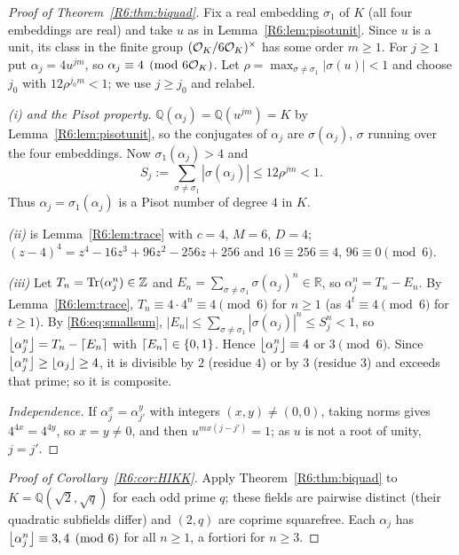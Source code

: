 \documentclass[11pt]{amsart}
\theoremstyle{definition}
\theoremstyle{remark}
\providecommand{\R}{\mathbb R}
\providecommand{\Q}{\mathbb Q}
\providecommand{\Z}{\mathbb Z}
\begin{document}
\begin{proof}[Proof of Theorem~\ref{R6:thm:biquad}]
Fix a real embedding $\sigma_1$ of $K$ (all four embeddings are real) and take $u$ as in
Lemma~\ref{R6:lem:pisotunit}. Since $u$ is a unit, its class in the finite group
$(\mathcal{O}_K/6\mathcal{O}_K)^\times$ has some order $m\ge1$. For $j\ge1$ put $\alpha_j=4u^{jm}$, so
$\alpha_j\equiv 4\pmod{6\mathcal{O}_K}$. Let $\rho=\max_{\sigma\neq\sigma_1}|\sigma(u)|<1$ and choose $j_0$ with
$12\rho^{j_0m}<1$; we use $j\ge j_0$ and relabel.

\emph{(i) and the Pisot property.} $\Q(\alpha_j)=\Q(u^{jm})=K$ by Lemma~\ref{R6:lem:pisotunit}, so the
conjugates of $\alpha_j$ are $\sigma(\alpha_j)$, $\sigma$ running over the four embeddings. Now
$\sigma_1(\alpha_j)>4$ and
\begin{equation}\label{R6:eq:smallsum}
S_j:=\sum_{\sigma\ne\sigma_1}|\sigma(\alpha_j)|\le 12\rho^{jm}<1 .
\end{equation}
Thus $\alpha_j=\sigma_1(\alpha_j)$ is a Pisot number of degree $4$ in $K$.

\emph{(ii)} is Lemma~\ref{R6:lem:trace} with $c=4$, $M=6$, $D=4$; $(z-4)^4=z^4-16z^3+96z^2-256z+256$
and $16\equiv 256\equiv 4$, $96\equiv0\pmod 6$.

\emph{(iii)} Let $T_n=\Tr(\alpha_j^n)\in\Z$ and $E_n=\sum_{\sigma\ne\sigma_1}\sigma(\alpha_j)^n\in\R$, so
$\alpha_j^n=T_n-E_n$. By Lemma~\ref{R6:lem:trace}, $T_n\equiv 4\cdot4^n\equiv 4\pmod 6$ for $n\ge1$
(as $4^t\equiv4\pmod 6$ for $t\ge1$). By \eqref{R6:eq:smallsum},
$|E_n|\le\sum_{\sigma\ne\sigma_1}|\sigma(\alpha_j)|^n\le S_j^n<1$, so
$\left\lfloor \alpha_j^n\right\rfloor=T_n-\left\lceil E_n\right\rceil$ with $\left\lceil E_n\right\rceil\in\{0,1\}$. Hence
$\left\lfloor \alpha_j^n\right\rfloor\equiv 4$ or $3\pmod 6$. Since $\left\lfloor \alpha_j^n\right\rfloor\ge\left\lfloor \alpha_j\right\rfloor\ge4$, it is divisible
by $2$ (residue $4$) or by $3$ (residue $3$) and exceeds that prime; so it is composite.

\emph{Independence.} If $\alpha_j^x=\alpha_{j'}^y$ with integers $(x,y)\ne(0,0)$, taking norms gives
$4^{4x}=4^{4y}$, so $x=y\neq0$, and then $u^{mx(j-j')}=1$; as $u$ is not a root of unity, $j=j'$.
\end{proof}

\begin{proof}[Proof of Corollary~\ref{R6:cor:HIKK}]
Apply Theorem~\ref{R6:thm:biquad} to $K=\Q(\sqrt2,\sqrt q)$ for each odd prime $q$; these fields are
pairwise distinct (their quadratic subfields differ) and $(2,q)$ are coprime squarefree. Each
$\alpha_j$ has $\left\lfloor \alpha_j^n\right\rfloor\equiv3,4\pmod 6$ for all $n\ge1$, a fortiori for $n\ge3$.
\end{proof}
\end{document}
